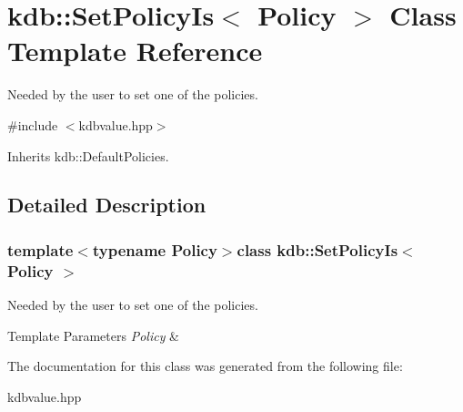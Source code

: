 \hypertarget{classkdb_1_1SetPolicyIs}{\section{kdb\+:\+:Set\+Policy\+Is$<$ Policy $>$ Class Template Reference}
\label{classkdb_1_1SetPolicyIs}
}


Needed by the user to set one of the policies.  




{\ttfamily \#include $<$kdbvalue.\+hpp$>$}



Inherits kdb\+::\+Default\+Policies.



\subsection{Detailed Description}
\subsubsection*{template$<$typename Policy$>$class kdb\+::\+Set\+Policy\+Is$<$ Policy $>$}

Needed by the user to set one of the policies. 


\begin{DoxyTemplParams}{Template Parameters}
{\em Policy} & \\
\hline
\end{DoxyTemplParams}


The documentation for this class was generated from the following file\+:\begin{DoxyCompactItemize}
\item 
kdbvalue.\+hpp\end{DoxyCompactItemize}
